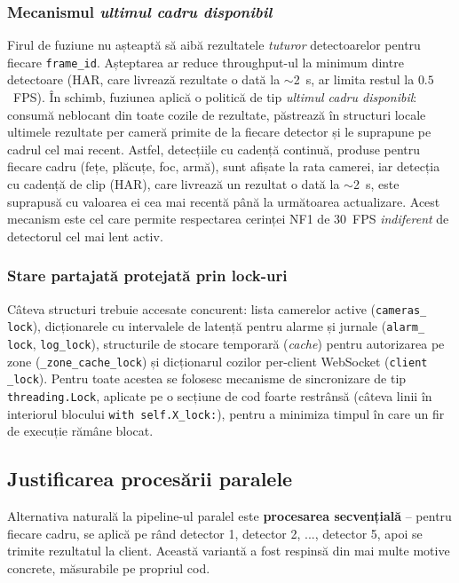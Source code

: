 \documentclass[../../main.tex]{subfiles}
\begin{document}
\subsubsection{Mecanismul \emph{ultimul cadru disponibil}}

Firul de fuziune nu așteaptă să aibă rezultatele \emph{tuturor} detectoarelor pentru fiecare \texttt{frame\_id}. Așteptarea ar reduce throughput-ul la minimum dintre detectoare (HAR, care livrează rezultate o dată la $\sim$2~s, ar limita restul la $0.5$~FPS). În schimb, fuziunea aplică o politică de tip \emph{ultimul cadru disponibil}: consumă neblocant din toate cozile de rezultate, păstrează în structuri locale ultimele rezultate per cameră primite de la fiecare detector și le suprapune pe cadrul cel mai recent. Astfel, detecțiile cu cadență continuă, produse pentru fiecare cadru (fețe, plăcuțe, foc, armă), sunt afișate la rata camerei, iar detecția cu cadență de clip (HAR), care livrează un rezultat o dată la $\sim$2~s, este suprapusă cu valoarea ei cea mai recentă până la următoarea actualizare. Acest mecanism este cel care permite respectarea cerinței NF1 de 30~FPS \emph{indiferent} de detectorul cel mai lent activ.

\subsubsection{Stare partajată protejată prin lock-uri}

Câteva structuri trebuie accesate concurent: lista camerelor active (\texttt{cameras\_ \linebreak lock}), dicționarele cu intervalele de latență pentru alarme și jurnale (\texttt{alarm\_ \linebreak lock}, \texttt{log\_lock}), structurile de stocare temporară (\textit{cache}) pentru autorizarea pe zone (\texttt{\_zone\_cache\_lock}) și dicționarul cozilor per-client WebSocket (\texttt{client} \texttt{\_lock}). Pentru toate acestea se folosesc mecanisme de sincronizare de tip \texttt{threading.Lock}, aplicate pe o secțiune de cod foarte restrânsă (câteva linii în interiorul blocului \texttt{with self.X\_lock:}), pentru a minimiza timpul în care un fir de execuție rămâne blocat.

\subsection{Justificarea procesării paralele}
\label{subsec:justificare_paralel}

Alternativa naturală la pipeline-ul paralel este \textbf{procesarea secvențială} -- pentru fiecare cadru, se aplică pe rând detector 1, detector 2, ..., detector 5, apoi se trimite rezultatul la client. Această variantă a fost respinsă din mai multe motive concrete, măsurabile pe propriul cod.
\end{document}
